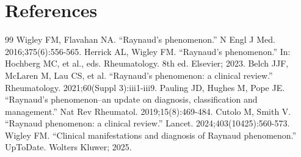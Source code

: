 \section*{References}
\begin{thebibliography}{99}
 Wigley FM, Flavahan NA. ``Raynaud's phenomenon.'' N Engl J Med. 2016;375(6):556-565.
 Herrick AL, Wigley FM. ``Raynaud's phenomenon.'' In: Hochberg MC, et al., eds. Rheumatology. 8th ed. Elsevier; 2023.
 Belch JJF, McLaren M, Lau CS, et al. ``Raynaud's phenomenon: a clinical review.'' Rheumatology. 2021;60(Suppl 3):iii1-iii9.
 Pauling JD, Hughes M, Pope JE. ``Raynaud's phenomenon--an update on diagnosis, classification and management.'' Nat Rev Rheumatol. 2019;15(8):469-484.
 Cutolo M, Smith V. ``Raynaud phenomenon: a clinical review.'' Lancet. 2024;403(10425):560-573.
 Wigley FM. ``Clinical manifestations and diagnosis of Raynaud phenomenon.'' UpToDate. Wolters Kluwer; 2025.
\end{thebibliography}
